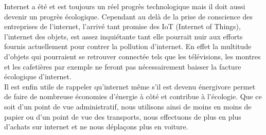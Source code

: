 \documentclass[a4paper,twocolumn,12pt]{article}
\begin{document}
	Internet a été et est toujours un réel progrès technologique mais il doit aussi devenir un progrès écologique. Cependant au delà de la prise de conscience des entreprises de l'internet, l’arrivé tant promise des IoT (Internet of Things), l’internet des objets, est assez inquiétante tant elle pourrait nuir aux efforts fournis actuellement pour contrer la pollution d’internet. En effet la multitude d’objets qui pourraient se retrouver connectée tels que les télévisions, les montres et les cafetières par exemple ne feront pas nécessairement baisser la facture écologique d’internet. \\
	
	Il est enfin utile de rappeler qu'internet même s'il est devenu énergivore permet de faire de nombreuse économies d'énergie à côté et contribue à l'écologie. Que ce soit d'un point de vue administratif, nous utilisons ainsi de moins en moins de papier ou d'un point de vue des transports, nous effectuons de plus en plus d'achats sur internet et ne nous déplaçons plus en voiture.




\end{document}
